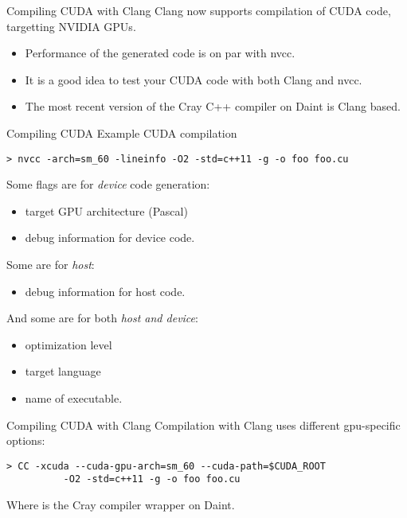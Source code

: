 \documentclass[aspectratio=43]{beamer}
\begin{document}
\begin{frame}[fragile]{Compiling CUDA with Clang}
    Clang now supports compilation of CUDA code, targetting NVIDIA GPUs.
    \begin{itemize}
        \item Performance of the generated code is on par with nvcc.
        \item It is a good idea to test your CUDA code with both Clang and nvcc.
        \item The most recent version of the Cray C++ compiler on Daint is Clang based.
    \end{itemize}
\end{frame}

\begin{frame}[fragile]{Compiling CUDA}
    Example CUDA compilation
    \begin{terminal}{}
    \begin{lstlisting}[style=terminal]
> nvcc -arch=sm_60 -lineinfo -O2 -std=c++11 -g -o foo foo.cu
    \end{lstlisting}
    \end{terminal}
    Some flags are for \emph{device} code generation:
    \begin{itemize}
        \item {} target GPU architecture (Pascal)
        \item {} debug information for device code.
    \end{itemize}
    Some are for \emph{host}:
    \begin{itemize}
        \item {} debug information for host code.
    \end{itemize}
    And some are for both \emph{host and device}:
    \begin{itemize}
        \item {} optimization level
        \item {} target language
        \item {} name of executable.
    \end{itemize}
\end{frame}

\begin{frame}[fragile]{Compiling CUDA with Clang}
    Compilation with Clang uses different gpu-specific options:

    \vspace{20pt}
    \begin{terminal}{}
    \begin{lstlisting}[style=terminal]
> CC -xcuda --cuda-gpu-arch=sm_60 --cuda-path=$CUDA_ROOT
          -O2 -std=c++11 -g -o foo foo.cu
    \end{lstlisting}
    \end{terminal}
    \vspace{20pt}
    Where  is the Cray compiler wrapper on Daint.
\end{frame}
\end{document}
